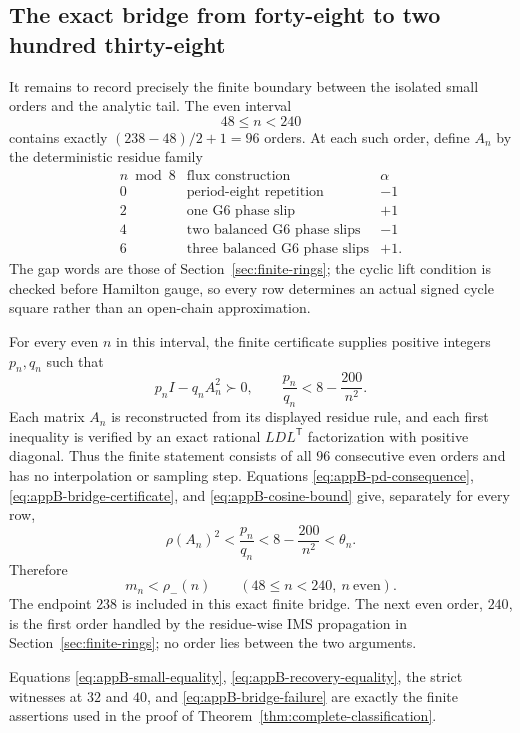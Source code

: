 \subsection{The exact bridge from forty-eight to two hundred thirty-eight}
\label{app:finite-bridge}

It remains to record precisely the finite boundary between the isolated
small orders and the analytic tail.  The even interval
\[
 48\leq n<240
\]
contains exactly \((238-48)/2+1=96\) orders.  At each such order, define
\(A_n\) by the deterministic residue family
\[
\begin{array}{c|l|c}
n\bmod8&\text{flux construction}&\alpha\\
\hline
0&\text{period-eight repetition}&-1\\
2&\text{one G6 phase slip}&+1\\
4&\text{two balanced G6 phase slips}&-1\\
6&\text{three balanced G6 phase slips}&+1.
\end{array}
\]
The gap words are those of Section~\ref{sec:finite-rings}; the cyclic lift
condition is checked before Hamilton gauge, so every row determines an
actual signed cycle square rather than an open-chain approximation.

For every even \(n\) in this interval, the finite certificate supplies
positive integers \(p_n,q_n\) such that
\begin{equation}\label{eq:appB-bridge-certificate}
 p_nI-q_nA_n^2\succ0,
 \qquad
 \frac{p_n}{q_n}<8-\frac{200}{n^2}.
\end{equation}
Each matrix \(A_n\) is reconstructed from its displayed residue rule, and
each first inequality is verified by an exact rational
\(LDL^{\mathsf T}\) factorization with positive diagonal.  Thus the finite
statement consists of all \(96\) consecutive even orders and has no
interpolation or sampling step.  Equations
\eqref{eq:appB-pd-consequence}, \eqref{eq:appB-bridge-certificate}, and
\eqref{eq:appB-cosine-bound} give, separately for every row,
\[
 \rho(A_n)^2
 <\frac{p_n}{q_n}
 <8-\frac{200}{n^2}
 <\theta_n.
\]
Therefore
\begin{equation}\label{eq:appB-bridge-failure}
 m_n<\rho_-(n)
 \qquad(48\leq n<240,\ n\ \text{even}).
\end{equation}
The endpoint \(238\) is included in this exact finite bridge.  The next
even order, \(240\), is the first order handled by the residue-wise IMS
propagation in Section~\ref{sec:finite-rings}; no order lies between the two
arguments.

Equations \eqref{eq:appB-small-equality},
\eqref{eq:appB-recovery-equality}, the strict witnesses at \(32\) and
\(40\), and \eqref{eq:appB-bridge-failure} are exactly the finite assertions
used in the proof of Theorem~\ref{thm:complete-classification}.

